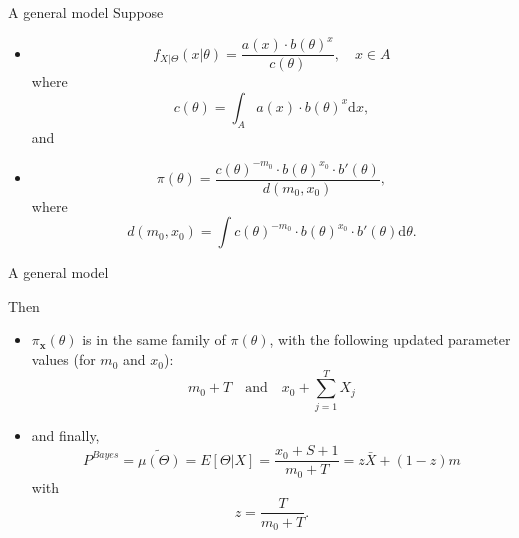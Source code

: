 \documentclass[11pt]{beamer}
\begin{document}
\begin{frame}{A general model}
Suppose
\begin{itemize}
\item $$f_{X|\Theta}(x|\theta)=\frac{a(x)\cdot b(\theta)^x}{c(\theta)},\quad x\in A$$
where
$$c(\theta)=\int_A a(x)\cdot b(\theta)^x \text{d}x,$$ and
\item
$$\pi(\theta)=\frac{c(\theta)^{-m_0}\cdot b(\theta)^{x_0}\cdot b'(\theta)}{d(m_0,x_0)},$$
where
$$d(m_0,x_0)=\int c(\theta)^{-m_0}\cdot b(\theta)^{x_0}\cdot b'(\theta) \text{d}\theta.$$
\end{itemize}

\end{frame}
\begin{frame}{A general model}

Then \begin{itemize}
\item
$\pi_\mathbf{x}(\theta)$ is in the same family of $\pi(\theta)$, with the following updated parameter values (for $m_0$ and $x_0$):
$$m_0+T \quad\text{and}\quad x_0+\sum_{j=1}^T X_{j}$$
\item and finally,
$$P^{Bayes}=\widetilde{\mu(\Theta)}=E[\Theta|X]=\frac{x_0+S+1}{m_0+T}
=z\bar{X}+(1-z)m$$
with
$$z=\frac{T}{m_0+T}.$$
\end{itemize}

\end{frame}
\end{document}
